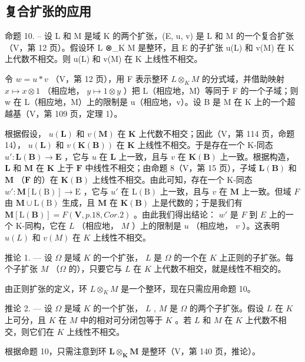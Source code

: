 \subsection{复合扩张的应用}

命题 10. -- 设 L 和 M 是域 K 的两个扩张，(E, u, v) 是 L 和 M 的一个复合扩张（V，第 12 页）。假设环 L ⊗\_K M 是整环，且 E 的子扩张 u(L) 和 v(M) 在 K 上代数不相交。则 u(L) 和 v(M) 在 K 上线性不相交。

令 \(w = u * v\) （V，第 12 页），用 F 表示整环 \(L \otimes_{K} M\) 的分式域，并借助映射 \(x \mapsto x \otimes 1\) （相应地， \(y \mapsto 1 \otimes y\) ）把 L（相应地，M）等同于 F 的一个子域；则 w 在 L（相应地，M）上的限制是 u（相应地，v）。设 B 是 M 在 K 上的一个超越基（V，第 109 页，定理 1）。

根据假设， \(u(\mathbf{L})\) 和 \(v(\mathbf{M})\) 在 \(\mathbf{K}\) 上代数不相交；因此（V，第 114 页，命题 14）， \(u(\mathbf{L})\) 和 \(v(\mathbf{K}(\mathbf{B}))\) 在 \(\mathbf{K}\) 上线性不相交。于是存在一个 K-同态 \(u': \mathbf{L}(\mathbf{B}) \to \mathbf{E}\) ，它与 \(u\) 在 \(\mathbf{L}\) 上一致，且与 \(v\) 在 \(\mathbf{K}(\mathbf{B})\) 上一致。根据构造， \(\mathbf{L}\) 和 \(\mathbf{M}\) 在 \(\mathbf{K}\) 上于 \(\mathbf{F}\) 中线性不相交；由命题 8（V，第 15 页），子域 \(\mathbf{L}(\mathbf{B})\) 和 \(\mathbf{M}\) （\(\mathbf{F}\) 的）在 \(\mathbf{K}(\mathbf{B})\) 上线性不相交。由此可知，存在一个 K-同态 \(w' \colon \mathbf{M}[\mathrm{L}(\mathrm{B})] \to \mathrm{E}\) ，它与 \(u'\) 在 \(\mathrm{L}(\mathrm{B})\) 上一致，且与 \(v\) 在 \(\mathbf{M}\) 上一致。但域 \(F\) 由 \(\mathbf{M} \cup \mathrm{L}(\mathrm{B})\) 生成，且 \(\mathbf{M}\) 在 \(\mathbf{K}(\mathbf{B})\) 上是代数的；于是我们有 \(\mathbf{M}[\mathrm{L}(\mathbf{B})] = F(\mathbf{V}, p. 18, Cor. 2)\) 。由此我们得出结论： \(w'\) 是 \(F\) 到 \(E\) 上的一个 K-同构，它在 \(L\) （相应地， \(M\) ）上的限制是 \(u\) （相应地， \(v\) ）。这表明 \(u(L)\) 和 \(v(M)\) 在 \(K\) 上线性不相交。

推论 1. --- 设 \(\Omega\) 是域 \(K\) 的一个扩张， \(L\) 是 \(\Omega\) 的一个在 \(K\) 上正则的子扩张。每个子扩张 \(M\) （\(\Omega\) 的），只要它与 \(L\) 在 \(K\) 上代数不相交，就是线性不相交的。

由正则扩张的定义，环 \(L \otimes_{K} M\) 是一个整环，现在只需应用命题 10。

推论 2. --- 设 \(\Omega\) 是域 \(K\) 的一个扩张， \(L\) , \(M\) 是 \(\Omega\) 的两个子扩张。假设 \(L\) 在 \(K\) 上可分，且 \(K\) 在 \(M\) 中的相对可分闭包等于 \(K\) 。若 \(L\) 和 \(M\) 在 \(K\) 上代数不相交，则它们在 \(K\) 上线性不相交。

根据命题 10，只需注意到环 \(\mathbf{L} \otimes_{\mathbf{K}} \mathbf{M}\) 是整环（V，第 140 页，推论）。

